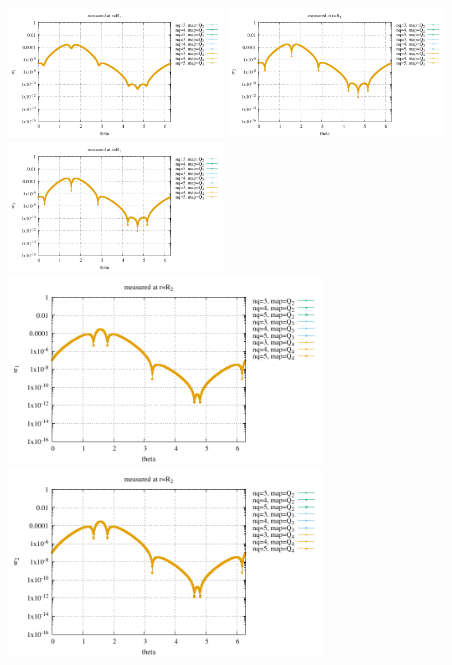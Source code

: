 \begin{center}
\includegraphics[width=5.7cm]{python_codes/fieldstone_152/results/exp2/sr1_R1}
\includegraphics[width=5.7cm]{python_codes/fieldstone_152/results/exp2/sr2_R1}
\includegraphics[width=5.7cm]{python_codes/fieldstone_152/results/exp2/sr3_R1}\\
\includegraphics[width=8.3cm]{python_codes/fieldstone_152/results/exp2/sr1_R2}
\includegraphics[width=8.3cm]{python_codes/fieldstone_152/results/exp2/sr2_R2}\\

\end{center}

